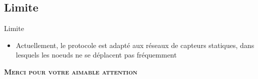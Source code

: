 \documentclass[12pt, c]{beamer}
\begin{document}
				\subsection{Limite}
					\begin{frame}{Limite}
						\transwipe
						\vspace{-0.21cm}
						\begin{block}{}
							\begin{itemize}
								\item[\ding{43}]Actuellement, le protocole est adapté aux réseaux de capteurs statiques, dans lesquels les noeuds ne se déplacent pas fréquemment
							\end{itemize}
						\end{block}
					\end{frame}
			
	
		
		\begin{frame}
\transdissolve
	\vspace{1cm}
	\begin{center}
	\huge \textbf{\textsc{Merci pour votre aimable attention}}
	\end{center}
\end{frame}
	
% 
%
\end{document}
